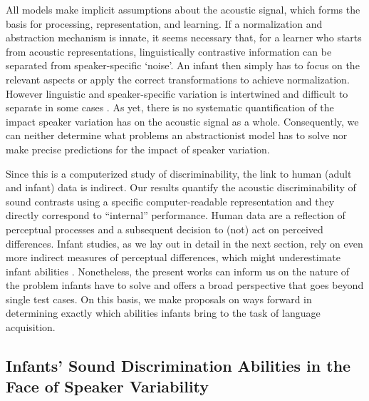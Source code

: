 \documentclass[10pt,letterpaper]{article}
\begin{document}
All models make implicit assumptions about the acoustic signal, which forms the basis for processing, representation, and learning. If a normalization and abstraction mechanism is innate, it seems necessary that, for a learner who starts from acoustic representations, linguistically contrastive information can be separated from speaker-specific `noise'. An infant then simply has to focus on the relevant aspects or apply the correct transformations to achieve normalization. However linguistic and speaker-specific variation is intertwined and difficult to separate in some cases \cite{JaegerReview}. As yet, there is no systematic quantification of the impact speaker variation has on the acoustic signal as a whole. 
Consequently, we can neither determine what problems an abstractionist model has to solve nor make precise predictions for the impact of speaker variation. 


Since this is a computerized study of discriminability, the link to human (adult and infant) data is indirect. Our results quantify the acoustic discriminability of sound contrasts using a specific computer-readable representation and they directly correspond to ``internal'' performance. Human data are a reflection of perceptual processes and a subsequent decision to (not) act on perceived differences. Infant studies, as we lay out in detail in the next section, rely on even more indirect measures of perceptual differences, which might underestimate infant abilities \cite{ApfelbaumMcMurray, BergmannFrontiers}. Nonetheless, the present works can inform us on the nature of the problem infants have to solve and offers a broad perspective that goes beyond single test cases. On this basis, we make proposals on ways forward in determining exactly which abilities infants bring to the task of language acquisition.



\subsection{Infants' Sound Discrimination Abilities in the Face of Speaker Variability}%
\end{document}
